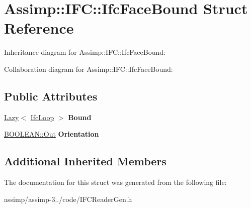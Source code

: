 \hypertarget{struct_assimp_1_1_i_f_c_1_1_ifc_face_bound}{\section{Assimp\+:\+:I\+F\+C\+:\+:Ifc\+Face\+Bound Struct Reference}
\label{struct_assimp_1_1_i_f_c_1_1_ifc_face_bound}
}


Inheritance diagram for Assimp\+:\+:I\+F\+C\+:\+:Ifc\+Face\+Bound\+:


Collaboration diagram for Assimp\+:\+:I\+F\+C\+:\+:Ifc\+Face\+Bound\+:
\subsection*{Public Attributes}
\begin{DoxyCompactItemize}
\item 
\hypertarget{struct_assimp_1_1_i_f_c_1_1_ifc_face_bound_a6eb4bb44925249368db8b0ddb59bbc06}{\hyperlink{struct_assimp_1_1_s_t_e_p_1_1_lazy}{Lazy}$<$ \hyperlink{struct_assimp_1_1_i_f_c_1_1_ifc_loop}{Ifc\+Loop} $>$ {\bfseries Bound}}\label{struct_assimp_1_1_i_f_c_1_1_ifc_face_bound_a6eb4bb44925249368db8b0ddb59bbc06}

\item 
\hypertarget{struct_assimp_1_1_i_f_c_1_1_ifc_face_bound_a2c8df6381d0cf7febb0f6e86aa41d15c}{\hyperlink{classboost_1_1shared__ptr}{B\+O\+O\+L\+E\+A\+N\+::\+Out} {\bfseries Orientation}}\label{struct_assimp_1_1_i_f_c_1_1_ifc_face_bound_a2c8df6381d0cf7febb0f6e86aa41d15c}

\end{DoxyCompactItemize}
\subsection*{Additional Inherited Members}


The documentation for this struct was generated from the following file\+:\begin{DoxyCompactItemize}
\item 
assimp/assimp-\/3../code/I\+F\+C\+Reader\+Gen.\+h\end{DoxyCompactItemize}
